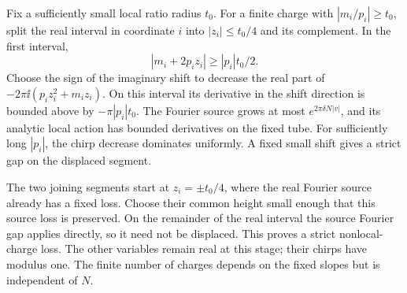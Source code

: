 Fix a sufficiently small local ratio radius $t_0$. For a finite charge with $|m_i/p_i|\ge t_0$, split the real interval in coordinate $i$ into $|z_i|\le t_0/4$ and its complement. In the first interval,
\[
 |m_i+2p_i z_i|\ge |p_i|t_0/2.
\]
Choose the sign of the imaginary shift to decrease the real part of
$-2\pi\ii(p_i z_i^2+m_i z_i)$. On this interval its derivative in the shift direction is bounded above by $-\pi|p_i|t_0$. The Fourier source grows at most $e^{2\pi\delta N|v|}$, and its analytic local action has bounded derivatives on the fixed tube. For sufficiently long $|p_i|$, the chirp decrease dominates uniformly. A fixed small shift gives a strict gap on the displaced segment.

The two joining segments start at $z_i=\pm t_0/4$, where the real Fourier source already has a fixed loss. Choose their common height small enough that this source loss is preserved. On the remainder of the real interval the source Fourier gap applies directly, so it need not be displaced. This proves a strict nonlocal-charge loss. The other variables remain real at this stage; their chirps have modulus one. The finite number of charges depends on the fixed slopes but is independent of $N$.

